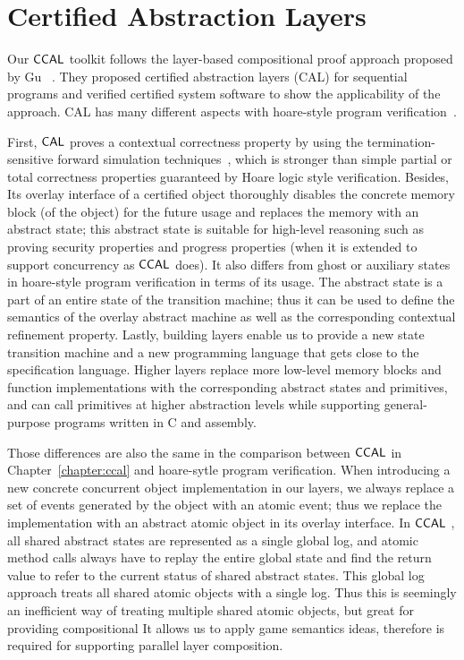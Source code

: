 
\section{Certified Abstraction Layers}
\label{chatper:related:sec:certified-abstraction-laayers}

Our $\mathsf{CCAL}$ toolkit follows the layer-based compositional proof approach proposed by Gu \etal~\cite{deepspec}.
They proposed certified abstraction layers (CAL) for sequential programs and 
verified certified system software to show the applicability of the approach.
CAL has many different aspects with
 hoare-style program verification~\cite{hoare69,reynolds02,boogie05,nanevski06}.

First, $\mathsf{CAL}$ proves a contextual correctness property by using the termination-sensitive forward simulation 
techniques~\cite{Lynch95,compcert}, 
which is stronger than simple partial or total correctness properties guaranteed by Hoare logic style verification.
Besides, Its overlay interface of a certified object thoroughly disables 
the concrete memory block (of the object)  for the future usage 
and replaces the memory with an abstract state;
this abstract state is suitable for high-level reasoning such as proving security properties and progress properties (when it is extended to support
concurrency as $\mathsf{CCAL}$ does). 
It also differs from ghost or auxiliary states in hoare-style program verification in terms of 
its usage.
The abstract state is a part of an entire state of the transition machine; 
thus it can be used to define the semantics of the overlay abstract machine
as well as the corresponding contextual refinement property.
Lastly,  building layers enable us to provide a new state transition machine and a new programming language that gets close to the specification language. 
Higher layers replace more low-level memory blocks and function implementations with 
the corresponding abstract states and primitives,
and can call primitives at higher abstraction levels while  
supporting general-purpose
programs written in C and assembly.

Those differences are also the same in the comparison between $\mathsf{CCAL}$ in Chapter~\ref{chapter:ccal} and 
hoare-sytle program verification. 
When introducing a new concrete concurrent object implementation in our layers, 
we always replace a set of events generated by the object with an atomic event; thus we replace the implementation with an abstract atomic object in its overlay interface. 
In $\mathsf{CCAL}$ , 
all shared abstract states are represented as a single global log,
and atomic method calls always have to 
replay the entire global state and find the return value to refer to the current status of shared abstract states.
This global log approach treats all shared atomic objects with a single log.
Thus this  is seemingly an inefficient way of treating multiple shared atomic objects,
but great for providing compositional 
It allows us to apply game semantics ideas, therefore
is required for supporting parallel layer composition.




